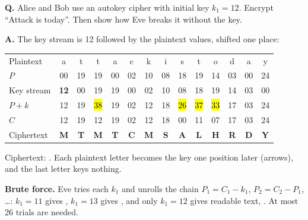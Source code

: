 \begin{worked}
\textbf{Q.} Alice and Bob use an autokey cipher with initial key $k_1 = 12$. Encrypt ``Attack is today''. Then show how Eve breaks it without the key.

\textbf{A.} The key stream is 12 followed by the plaintext values, shifted one place:
\begin{center}
\end{center}
\begin{center}\small\setlength{\tabcolsep}{3.6pt}
\begin{tabular}{@{}l*{13}{c}@{}}
\toprule
Plaintext & a&t&t&a&c&k&i&s&t&o&d&a&y\\
$P$ & 00&19&19&00&02&10&08&18&19&14&03&00&24\\
Key stream & \textbf{12}&00&19&19&00&02&10&08&18&19&14&03&00\\
$P + k$ & 12&19&\hl{38}&19&02&12&18&\hl{26}&\hl{37}&\hl{33}&17&03&24\\
$C$ & 12&19&12&19&02&12&18&00&11&07&17&03&24\\
Ciphertext & \textbf{M}&\textbf{T}&\textbf{M}&\textbf{T}&\textbf{C}&\textbf{M}&\textbf{S}&\textbf{A}&\textbf{L}&\textbf{H}&\textbf{R}&\textbf{D}&\textbf{Y}\\
\bottomrule
\end{tabular}
\end{center}
Ciphertext: \textbf{}. Each plaintext letter becomes the key one position later (arrows), and the last letter  keys nothing.

\textbf{Brute force.} Eve tries each $k_1$ and unrolls the chain $P_1 = C_1 - k_1$, $P_2 = C_2 - P_1$, \dots:
$k_1 = 11$ gives , $k_1 = 13$ gives , and only $k_1 = 12$ gives readable text, . At most 26 trials are needed.
\end{worked}

